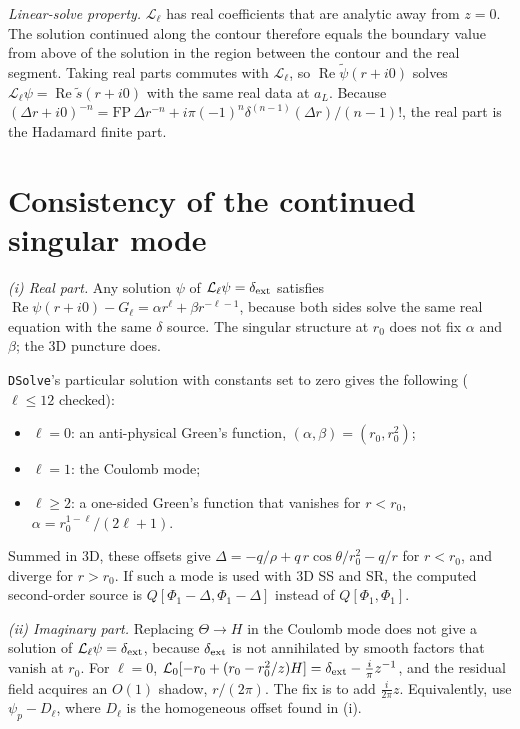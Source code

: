 \documentclass[aps,prl,twocolumn,superscriptaddress,nofootinbib,floatfix]{revtex4-2}
\renewcommand{\Re}{\operatorname{Re}}
\newcommand{\dext}{\delta_{\rm ext}}
\newcommand{\Lop}{\mathcal{L}_\ell}
\begin{document}
\emph{Linear-solve property.}
$\Lop$ has real coefficients that are analytic away from $z=0$.
The solution continued along the contour therefore equals the boundary value from above of the solution in the region between the contour and the real segment.
Taking real parts commutes with $\Lop$, so $\Re\tilde\psi(r+i0)$ solves $\Lop\psi=\Re\tilde s(r+i0)$ with the same real data at $a_L$.
Because $(\Delta r+i0)^{-n}=\mathrm{FP}\,\Delta r^{-n}+i\pi(-1)^n\delta^{(n-1)}(\Delta r)/(n-1)!$, the real part is the Hadamard finite part.

\section{Consistency of the continued singular mode}\label{app:consistency}
\emph{(i) Real part.}
Any solution $\psi$ of $\Lop\psi=\dext$ satisfies $\Re\psi(r+i0)-G_\ell=\alpha r^\ell+\beta r^{-\ell-1}$, because both sides solve the same real equation with the same $\delta$ source.
The singular structure at $r_0$ does not fix $\alpha$ and $\beta$; the 3D puncture does.

\texttt{DSolve}'s particular solution with constants set to zero gives the following ($\ell\le12$ checked):
\begin{itemize}
\item $\ell=0$: an anti-physical Green's function, $(\alpha,\beta)=(r_0,r_0^2)$;
\item $\ell=1$: the Coulomb mode;
\item $\ell\ge2$: a one-sided Green's function that vanishes for $r<r_0$, $\alpha=r_0^{1-\ell}/(2\ell+1)$.
\end{itemize}
Summed in 3D, these offsets give $\Delta=-q/\rho+q\,r\cos\theta/r_0^2-q/r$ for $r<r_0$, and diverge for $r>r_0$.
If such a mode is used with 3D SS and SR, the computed second-order source is $Q[\Phi_1-\Delta,\Phi_1-\Delta]$ instead of $Q[\Phi_1,\Phi_1]$.

\emph{(ii) Imaginary part.}
Replacing $\Theta\to H$ in the Coulomb mode does not give a solution of $\Lop\psi=\dext$, because $\dext$ is not annihilated by smooth factors that vanish at $r_0$.
For $\ell=0$, $\mathcal L_0[-r_0+(r_0-r_0^2/z)H]=\dext-\tfrac{i}{\pi}z^{-1}$, and the residual field acquires an $O(1)$ shadow, $r/(2\pi)$.
The fix is to add $\tfrac{i}{2\pi}z$.
Equivalently, use $\psi_p-D_\ell$, where $D_\ell$ is the homogeneous offset found in (i).
\end{document}
